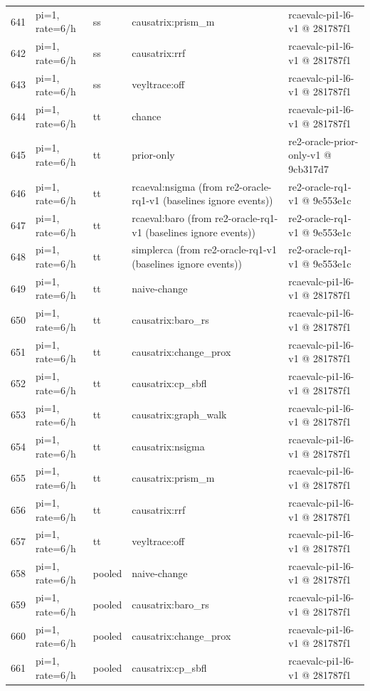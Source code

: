 \begin{longtable}{@{}r>{\raggedright\arraybackslash}p{48.0pt}>{\raggedright\arraybackslash}p{18.0pt}>{\raggedright\arraybackslash}p{108.0pt}>{\raggedright\arraybackslash}p{105.0pt}@{}}
641 & pi=1, rate=6/h & ss & causatrix:prism\_m & rcaevalc-pi1-l6-v1 @ 281787f1 \\
642 & pi=1, rate=6/h & ss & causatrix:rrf & rcaevalc-pi1-l6-v1 @ 281787f1 \\
643 & pi=1, rate=6/h & ss & veyltrace:off & rcaevalc-pi1-l6-v1 @ 281787f1 \\
644 & pi=1, rate=6/h & tt & chance & rcaevalc-pi1-l6-v1 @ 281787f1 \\
645 & pi=1, rate=6/h & tt & prior-only & re2-oracle-prior-only-v1 @ 9cb317d7 \\
646 & pi=1, rate=6/h & tt & rcaeval:nsigma (from re2-oracle-rq1-v1 (baselines ignore events)) & re2-oracle-rq1-v1 @ 9e553e1c \\
647 & pi=1, rate=6/h & tt & rcaeval:baro (from re2-oracle-rq1-v1 (baselines ignore events)) & re2-oracle-rq1-v1 @ 9e553e1c \\
648 & pi=1, rate=6/h & tt & simplerca (from re2-oracle-rq1-v1 (baselines ignore events)) & re2-oracle-rq1-v1 @ 9e553e1c \\
649 & pi=1, rate=6/h & tt & naive-change & rcaevalc-pi1-l6-v1 @ 281787f1 \\
650 & pi=1, rate=6/h & tt & causatrix:baro\_rs & rcaevalc-pi1-l6-v1 @ 281787f1 \\
651 & pi=1, rate=6/h & tt & causatrix:change\_prox & rcaevalc-pi1-l6-v1 @ 281787f1 \\
652 & pi=1, rate=6/h & tt & causatrix:cp\_sbfl & rcaevalc-pi1-l6-v1 @ 281787f1 \\
653 & pi=1, rate=6/h & tt & causatrix:graph\_walk & rcaevalc-pi1-l6-v1 @ 281787f1 \\
654 & pi=1, rate=6/h & tt & causatrix:nsigma & rcaevalc-pi1-l6-v1 @ 281787f1 \\
655 & pi=1, rate=6/h & tt & causatrix:prism\_m & rcaevalc-pi1-l6-v1 @ 281787f1 \\
656 & pi=1, rate=6/h & tt & causatrix:rrf & rcaevalc-pi1-l6-v1 @ 281787f1 \\
657 & pi=1, rate=6/h & tt & veyltrace:off & rcaevalc-pi1-l6-v1 @ 281787f1 \\
658 & pi=1, rate=6/h & pooled & naive-change & rcaevalc-pi1-l6-v1 @ 281787f1 \\
659 & pi=1, rate=6/h & pooled & causatrix:baro\_rs & rcaevalc-pi1-l6-v1 @ 281787f1 \\
660 & pi=1, rate=6/h & pooled & causatrix:change\_prox & rcaevalc-pi1-l6-v1 @ 281787f1 \\
661 & pi=1, rate=6/h & pooled & causatrix:cp\_sbfl & rcaevalc-pi1-l6-v1 @ 281787f1 \\

\end{longtable}
